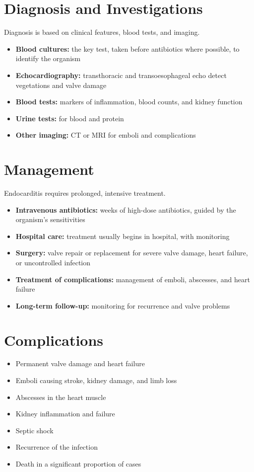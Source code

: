 \section*{Diagnosis and Investigations}
Diagnosis is based on clinical features, blood tests, and imaging.
\begin{itemize}
    \item \textbf{Blood cultures:} the key test, taken before antibiotics where possible, to identify the organism
    \item \textbf{Echocardiography:} transthoracic and transoesophageal echo detect vegetations and valve damage
    \item \textbf{Blood tests:} markers of inflammation, blood counts, and kidney function
    \item \textbf{Urine tests:} for blood and protein
    \item \textbf{Other imaging:} CT or MRI for emboli and complications
\end{itemize}

\section*{Management}
Endocarditis requires prolonged, intensive treatment.
\begin{itemize}
    \item \textbf{Intravenous antibiotics:} weeks of high-dose antibiotics, guided by the organism's sensitivities
    \item \textbf{Hospital care:} treatment usually begins in hospital, with monitoring
    \item \textbf{Surgery:} valve repair or replacement for severe valve damage, heart failure, or uncontrolled infection
    \item \textbf{Treatment of complications:} management of emboli, abscesses, and heart failure
    \item \textbf{Long-term follow-up:} monitoring for recurrence and valve problems
\end{itemize}

\section*{Complications}
\begin{itemize}
    \item Permanent valve damage and heart failure
    \item Emboli causing stroke, kidney damage, and limb loss
    \item Abscesses in the heart muscle
    \item Kidney inflammation and failure
    \item Septic shock
    \item Recurrence of the infection
    \item Death in a significant proportion of cases
\end{itemize}


